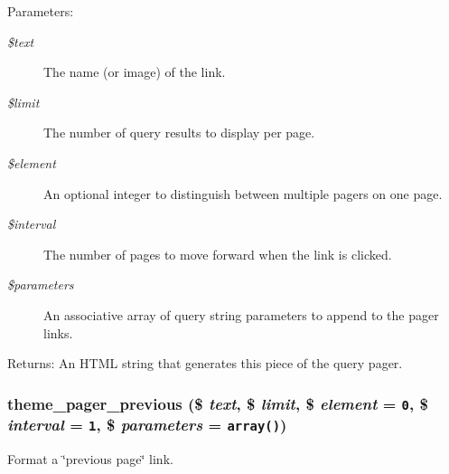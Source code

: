 \begin{Desc}
\item[Parameters:]
\begin{description}
\item[{\em \$text}]The name (or image) of the link. \item[{\em \$limit}]The number of query results to display per page. \item[{\em \$element}]An optional integer to distinguish between multiple pagers on one page. \item[{\em \$interval}]The number of pages to move forward when the link is clicked. \item[{\em \$parameters}]An associative array of query string parameters to append to the pager links. \end{description}
\end{Desc}
\begin{Desc}
\item[Returns:]An HTML string that generates this piece of the query pager. \end{Desc}
\hypertarget{group__themeable_gd41c6c0b85a0a041610f9310fd1e39fd}{
\subsubsection[{theme\_\-pager\_\-previous}]{\setlength{\rightskip}{0pt plus 5cm}theme\_\-pager\_\-previous (\$ {\em text}, \/  \$ {\em limit}, \/  \$ {\em element} = {\tt 0}, \/  \$ {\em interval} = {\tt 1}, \/  \$ {\em parameters} = {\tt array()})}}
\label{group__themeable_gd41c6c0b85a0a041610f9310fd1e39fd}


Format a \char`\"{}previous page\char`\"{} link.

